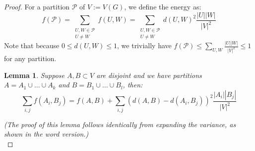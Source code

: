 \documentclass[a4paper]{article}
\newtheorem{lem}[thm]{Lemma}
\begin{document}
\begin{proof}
    For a partition $\mathcal{P}$ of $V := V(G)$, we define the energy as:
    \[
        f(\mathcal{P}) = \sum_{\substack{U,W\in \mathcal{P} \\ U \neq W}} f(U,W) = \sum_{\substack{U,W\in \mathcal{P} \\ U \neq W}} d(U,W)^2\frac{|U||W|}{|V|^2}
    \]
    Note that because $0 \le d(U,W) \le 1$, we trivially have $f(\mathcal{P}) \le \sum_{U,W} \frac{|U||W|}{|V|^2} \le 1$ for any partition.

    \begin{lem}
        Suppose $A,B \subset V$ are disjoint and we have partitions $A = A_1 \cup \dots \cup A_k$ and $B = B_1 \cup \dots \cup B_l$, then:
        \[
            \sum_{i,j}f(A_i,B_j) = f(A,B) + \sum_{i,j} \left( d(A,B) - d(A_i,B_j) \right)^2\frac{|A_i||B_j|}{|V|^2}
        \]
    \end{lem}
    \noindent \textit{(The proof of this lemma follows identically from expanding the variance, as shown in the word version.)} \\


\end{proof}
\end{document}
